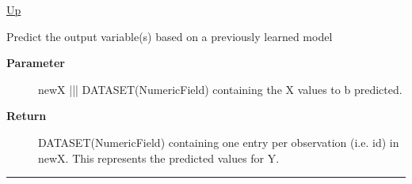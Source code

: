 \hyperlink{ecldoc:ml_core.interfaces.iregression}{Up}

\par
Predict the output variable(s) based on a previously learned model

\par
\begin{description}
\item [\textbf{Parameter}] newX ||| DATASET(NumericField) containing the X values to b predicted.
\item [\textbf{Return}] DATASET(NumericField) containing one entry per observation (i.e. id) in newX. This represents the predicted values for Y.
\end{description}

\rule{\textwidth}{0.4pt}


